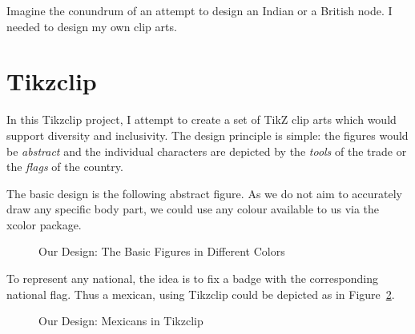\documentclass[a4paper]{article}
\begin{document}
Imagine the conundrum of an attempt to design an Indian or a British node. I needed to design my own clip arts.


\section{Tikzclip}
In this Tikzclip project, I attempt to create a set of TikZ clip arts which would support diversity and inclusivity. The design principle is simple: the figures would be \emph{abstract} and the individual characters are depicted by the \emph{tools} of the trade or the \emph{flags} of the country. 

The basic design is the following abstract figure. As we do not aim to accurately draw any specific body part, we could use any colour available to us via the xcolor package.

\begin{figure}[htb]
    \centering
     \caption{ Our Design: The Basic Figures in Different Colors}
    \label{fig:Tikzclip-basic}
   \end{figure}

To represent any national, the idea is to fix a badge with the corresponding national flag. Thus a mexican, using Tikzclip could be depicted as in Figure~\ref{fig:Tikzclip-mexican}.

\begin{figure}[htb]
    \centering
       \caption{ Our Design: Mexicans in Tikzclip}
    \label{fig:Tikzclip-mexican}
 
\end{figure}
\end{document}
